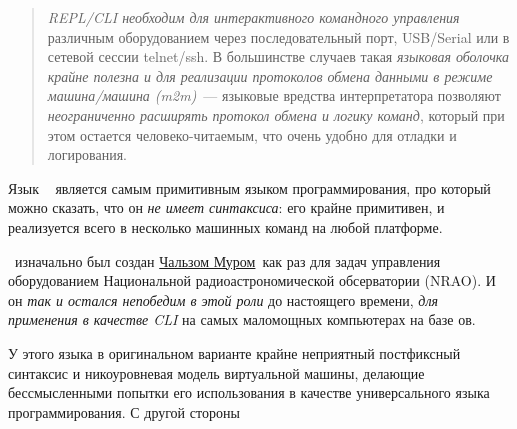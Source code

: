 \begin{quotation}\noindent
\emph{REPL/CLI необходим для интерактивного командного управления} различным
оборудованием через последовательный порт, USB/Serial или в сетевой сессии
telnet/ssh. В большинстве случаев такая \emph{языковая оболочка крайне полезна и
для реализации протоколов обмена данными в режиме машина/машина (m2m)}\ ---
языковые вредства интерпретатора позволяют \emph{неограниченно расширять
протокол обмена и логику команд}, который при этом остается человеко-читаемым,
что очень удобно для отладки и логирования.
\end{quotation}

\clearpage
\noindent
Язык \F\ \cite{starting} является самым примитивным языком программирования, про
который можно сказать, что он \textit{не имеет синтаксиса}: его 
крайне примитивен, и реализуется всего в несколько машинных команд на любой
платформе.

\F\ изначально был создан
\href{https://ru.wikipedia.org/wiki/%D0%9C%D1%83%D1%80,\_%D0%A7%D0%B0%D1%80%D0%BB%D1%8C%D0%B7\_(%D0%BF%D1%80%D0%BE%D0%B3%D1%80%D0%B0%D0%BC%D0%BC%D0%B8%D1%81%D1%82)}{Чальзом
Муром}\ как раз для задач управления оборудованием Национальной
радиоастрономической обсерватории (NRAO). И он \textit{так и остался непобедим в
этой роли} до настоящего времени, \textit{для применения в качестве CLI} на
самых маломощных компьютерах на базе ов.

У этого языка в оригинальном варианте крайне неприятный постфиксный синтаксис и
никоуровневая модель виртуальной машины, делающие бессмысленными попытки
его использования в качестве универсального языка программирования. С другой
стороны

\secup
